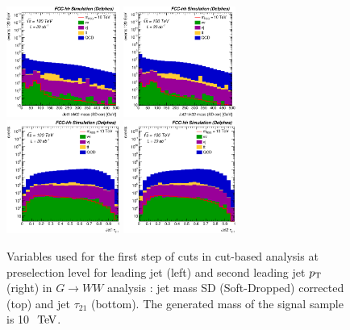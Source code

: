 \documentclass{cernrep}
\begin{document}
\begin{figure}[!htb]\centering
\includegraphics[width=0.33\textwidth]{Fig/RSGww/Jet1_trk02_SD_Cor_m_sel0_nostack_log.eps}
\includegraphics[width=0.33\textwidth]{Fig/RSGww/Jet2_trk02_SD_Cor_m_sel0_nostack_log.eps}
\includegraphics[width=0.33\textwidth]{Fig/RSGww/Jet1_tau21_sel0_nostack_log.eps}
\includegraphics[width=0.33\textwidth]{Fig/RSGww/Jet2_tau21_sel0_nostack_log.eps}
\caption{Variables used for the first step of cuts in cut-based analysis at preselection level for leading jet (left) and second leading jet $p\sb{\scriptstyle\mathrm{T}}$ (right) in $G \rightarrow WW$ analysis : jet mass SD (Soft-Dropped) corrected (top) and jet $\tau_{21}$ (bottom). The generated mass of the signal sample is 10 $\TeV$.}
\label{fig:RSGww_sel0_cut}
\end{figure}
\end{document}
